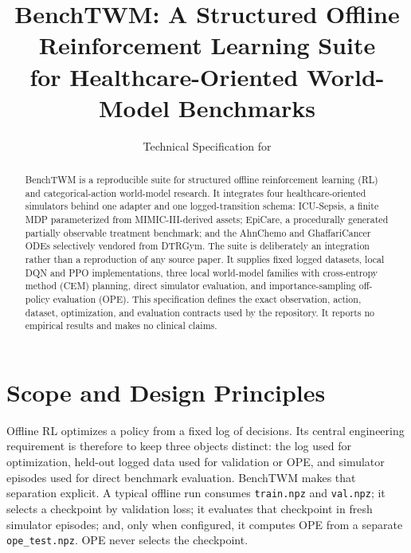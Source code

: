 \documentclass[10pt,twocolumn]{article}
\title{BenchTWM: A Structured Offline Reinforcement Learning Suite\\
for Healthcare-Oriented World-Model Benchmarks}
\author{Technical Specification for \code{zmain\_repo}}
\date{}
\newcommand{\code}[1]{\texttt{#1}}
\begin{document}
\maketitle

\begin{abstract}
BenchTWM is a reproducible suite for structured offline reinforcement learning (RL) and categorical-action world-model research. It integrates four healthcare-oriented simulators behind one adapter and one logged-transition schema: ICU-Sepsis, a finite MDP parameterized from MIMIC-III-derived assets; EpiCare, a procedurally generated partially observable treatment benchmark; and the AhnChemo and GhaffariCancer ODEs selectively vendored from DTRGym. The suite is deliberately an integration rather than a reproduction of any source paper. It supplies fixed logged datasets, local DQN and PPO implementations, three local world-model families with cross-entropy method (CEM) planning, direct simulator evaluation, and importance-sampling off-policy evaluation (OPE). This specification defines the exact observation, action, dataset, optimization, and evaluation contracts used by the repository. It reports no empirical results and makes no clinical claims.
\end{abstract}

\section{Scope and Design Principles}
\label{sec:scope}

Offline RL optimizes a policy from a fixed log of decisions. Its central engineering requirement is therefore to keep three objects distinct: the log used for optimization, held-out logged data used for validation or OPE, and simulator episodes used for direct benchmark evaluation. BenchTWM makes that separation explicit. A typical offline run consumes \code{train.npz} and \code{val.npz}; it selects a checkpoint by validation loss; it evaluates that checkpoint in fresh simulator episodes; and, only when configured, it computes OPE from a separate \code{ope\_test.npz}. OPE never selects the checkpoint.
\end{document}

